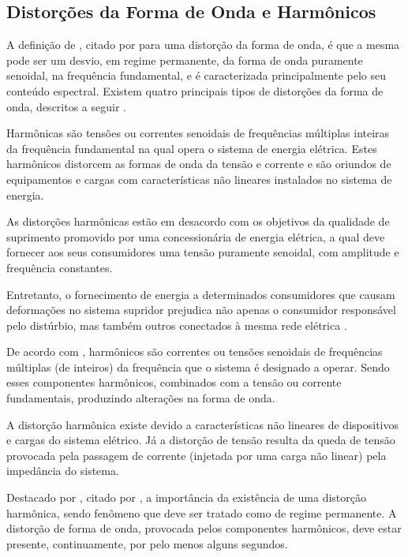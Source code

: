 \subsection{Distorções da Forma de Onda e Harmônicos}
\par 
A definição de \cite{OLIVE}, citado por \cite{DEL03} para uma distorção da forma de onda, é que a mesma pode ser um desvio, em regime permanente, da forma de onda puramente senoidal, na frequência fundamental, e é caracterizada principalmente pelo seu conteúdo espectral. Existem quatro principais tipos de distorções da forma de onda, descritos a seguir \citep{DUG96}.
\par
Harmônicas são tensões ou correntes senoidais de frequências múltiplas inteiras da frequência fundamental na qual opera o sistema de energia elétrica. Estes harmônicos distorcem as formas de onda da tensão e corrente e são oriundos de equipamentos e cargas com características não lineares instalados no sistema de energia. 
\par
As distorções harmônicas estão em desacordo com os objetivos da qualidade de suprimento promovido por uma concessionária de energia elétrica, a qual deve fornecer aos seus consumidores uma tensão puramente senoidal, com amplitude e frequência constantes. \par
\par
Entretanto, o fornecimento de energia a determinados consumidores que causam deformações no sistema supridor prejudica não apenas o consumidor responsável pelo distúrbio, mas também outros conectados à mesma rede elétrica \citep{DEL03}.
\par
De acordo com \cite{FER99}, harmônicos são correntes ou tensões senoidais de frequências múltiplas (de inteiros) da frequência que o sistema é designado a operar. Sendo esses componentes harmônicos, combinados com a tensão ou corrente fundamentais, produzindo alterações na forma de onda. 
\par
A distorção harmônica existe devido a características não lineares de dispositivos e cargas do sistema elétrico. Já a distorção de tensão resulta da queda de tensão provocada pela passagem de corrente (injetada por uma carga não linear) pela impedância do sistema.
\par
Destacado por \cite{DUG96}, citado por \cite{FER99}, a importância da existência de uma distorção harmônica, sendo fenômeno que deve ser tratado como de regime permanente. A distorção de forma de onda, provocada pelos componentes harmônicos, deve estar presente, continuamente, por pelo menos alguns segundos.

